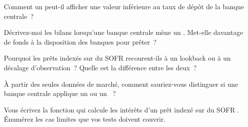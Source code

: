 \begin{interviewq}\label{iq:m2:central-banks-and-the-short-rate:2}
Comment un  peut-il afficher une valeur inférieure au taux de dépôt de la banque centrale~?
\end{interviewq}

\begin{interviewq}\label{iq:m2:central-banks-and-the-short-rate:3}
Décrivez-moi les bilans lorsqu'une banque centrale mène un
. Met-elle davantage de fonds à la disposition des banques pour prêter~?
\end{interviewq}

\begin{interviewq}\label{iq:m2:central-banks-and-the-short-rate:4}
Pourquoi les prêts indexés sur du SOFR  recourent-ils à un
lookback ou à un décalage d'observation~? Quelle est la différence entre les deux~?
\end{interviewq}

\begin{interviewq}\label{iq:m2:central-banks-and-the-short-rate:5}
À partir des seules données de marché, comment sauriez-vous distinguer si une
banque centrale applique un  ou un ~?
\end{interviewq}

\begin{interviewq}\label{iq:m2:central-banks-and-the-short-rate:6}
Vous écrivez la fonction qui calcule les intérêts d'un prêt indexé sur du SOFR
. Énumérez les cas limites que vos tests doivent couvrir.
\end{interviewq}
